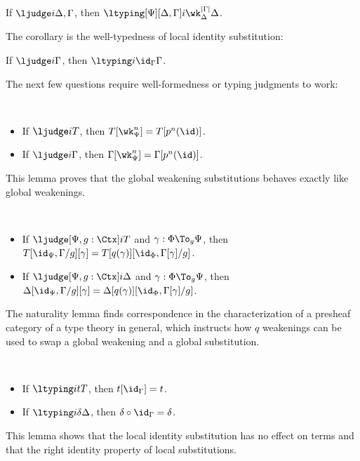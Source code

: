 \begin{lemma}
  If $\ljudge i {\Delta, \Gamma}$, then $\ltyping[\Psi][\Delta, \Gamma] i
  {\wk^{|\Gamma|}_{\Delta}}{\Delta}$. 
\end{lemma}
The corollary is the well-typedness of local identity substitution:
\begin{corollary}
  If $\ljudge i \Gamma$, then $\ltyping i {\id_{\Gamma}}{\Gamma}$. 
\end{corollary}

The next few questions require well-formedness or typing judgments to work:
\begin{lemma} $ $
  \begin{itemize}
  \item If $\ljudge i T$, then $T[\wk^n_{\Psi}] = T[p^n(\id)]$. 
  \item If $\ljudge i \Gamma$, then $\Gamma[\wk^n_{\Psi}] = \Gamma[p^n(\id)]$. 
  \end{itemize}
\end{lemma}
This lemma proves that the global weakening substitutions behaves exactly like global
weakenings.

\begin{lemma}[Naturality]$ $
  \begin{itemize}
  \item If $\ljudge[\Psi,g:\Ctx] i T$ and $\gamma : \Phi \To_g \Psi$, then
    $T[\id_{\Psi}, \Gamma/g][\gamma] = T[q(\gamma)][\id_{\Phi},\Gamma[\gamma]/g]$.
  \item If $\ljudge[\Psi,g:\Ctx] i \Delta$ and $\gamma : \Phi \To_g \Psi$, then
    $\Delta[\id_{\Psi}, \Gamma/g][\gamma] = \Delta[q(\gamma)][\id_{\Phi},\Gamma[\gamma]/g]$.
  \end{itemize}
\end{lemma}
The naturality lemma finds correspondence in the characterization of a presheaf
category of a type theory in general, which instructs how $q$ weakenings can be used
to swap a global weakening and a global substitution. %

\begin{lemma}$ $
  \begin{itemize}
  \item If $\ltyping i t T$, then $t[\id_{\Gamma}] = t$. 
  \item If $\ltyping i \delta \Delta$, then $\delta \circ \id_{\Gamma} = \delta$. 
  \end{itemize}
\end{lemma}
This lemma shows that the local identity substitution has no effect on terms and that
the right identity property of local substitutions. %

